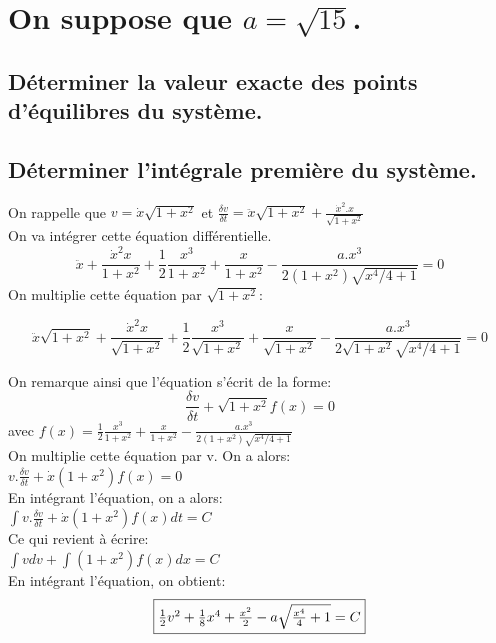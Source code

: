 \documentclass[10pt,a4paper]{article}
\begin{document}
\section{On suppose que $a=\sqrt{15}$.}
\subsection{Déterminer la valeur exacte des points d'équilibres du système.}
\subsection{Déterminer l'intégrale première du système.}
	On rappelle que $v=\dot{x}\sqrt{1 + x^2}$ et $\frac{\delta{v}}{\delta{t}}=\ddot{x}\sqrt{1 + x^2} + \frac{\dot{x}^2.x}{\sqrt{1+x^2}}$ \\
On va intégrer cette équation différentielle.
\[  \ddot{x}+\frac{\dot{x}^2x}{1+x^2} + \frac{1}{2}\frac{x^3}{1+x^2} + \frac{x}{1+x^2} - \frac{a.x^3}{2(1+x^2)\sqrt{x^4/4+1}}=0 \]	
On multiplie cette équation par $\sqrt{1+x^2}$:

\[  \ddot{x}\sqrt{1+x^2}+\frac{\dot{x}^2x}{\sqrt{1+x^2}} + \frac{1}{2}\frac{x^3}{\sqrt{1+x^2}} + \frac{x}{\sqrt{1+x^2}} - \frac{a.x^3}{2\sqrt{1+x^2}\sqrt{x^4/4+1}}=0 \]	

On remarque ainsi que l'équation s'écrit de la forme:\\
\[ \frac{\delta{v}}{\delta{t}} + \sqrt{1+x^2}f(x) = 0 \] avec $f(x)=  \frac{1}{2}\frac{x^3}{1+x^2} + \frac{x}{1+x^2} - \frac{a.x^3}{2(1+x^2)\sqrt{x^4/4+1}}$ \\
On multiplie cette équation par v. On a alors:\\
$ v.\frac{\delta{v}}{\delta{t}} + \dot{x}(1+x^2)f(x) = 0$\\
En intégrant l'équation, on a alors:\\
$ \int v.\frac{\delta{v}}{\delta{t}} + \dot{x}(1+x^2)f(x) dt= C$\\
Ce qui revient à écrire:\\
$ \int vdv + \int (1+x^2)f(x)dx= C$\\
En intégrant l'équation, on obtient:\\
\[\fbox{$ \frac{1}{2}v^2 + \frac{1}{8}x^4 + \frac{x^2}{2} - a\sqrt{\frac{x^4}{4} + 1} = C  $}\]

 

	
\end{document}
